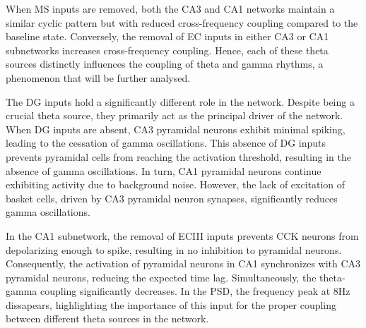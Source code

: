 \documentclass[../main.tex]{subfiles}
\begin{document}
When MS inputs are removed, both the CA3 and CA1 networks maintain a similar cyclic pattern but with reduced cross-frequency coupling compared to the baseline state.
Conversely, the removal of EC inputs in either CA3 or CA1 subnetworks increases cross-frequency coupling.
Hence, each of these theta sources distinctly influences the coupling of theta and gamma rhythms, a phenomenon that will be further analysed.

The DG inputs hold a significantly different role in the network.
Despite being a crucial theta source, they primarily act as the principal driver of the network.
When DG inputs are absent, CA3 pyramidal neurons exhibit minimal spiking, leading to the cessation of gamma oscillations.
This absence of DG inputs prevents pyramidal cells from reaching the activation threshold, resulting in the absence of gamma oscillations.
In turn, CA1 pyramidal neurons continue exhibiting activity due to background noise.
However, the lack of excitation of basket cells, driven by CA3 pyramidal neuron synapses, significantly reduces gamma oscillations.

In the CA1 subnetwork, the removal of ECIII inputs prevents CCK neurons from depolarizing enough to spike, resulting in no inhibition to pyramidal neurons.
Consequently, the activation of pyramidal neurons in CA1 synchronizes with CA3 pyramidal neurons, reducing the expected time lag.
Simultaneously, the theta-gamma coupling significantly decreases. 
In the PSD, the frequency peak at 8Hz dissapears, highlighting the importance of this input for the proper coupling between different theta sources in the network.
\end{document}
